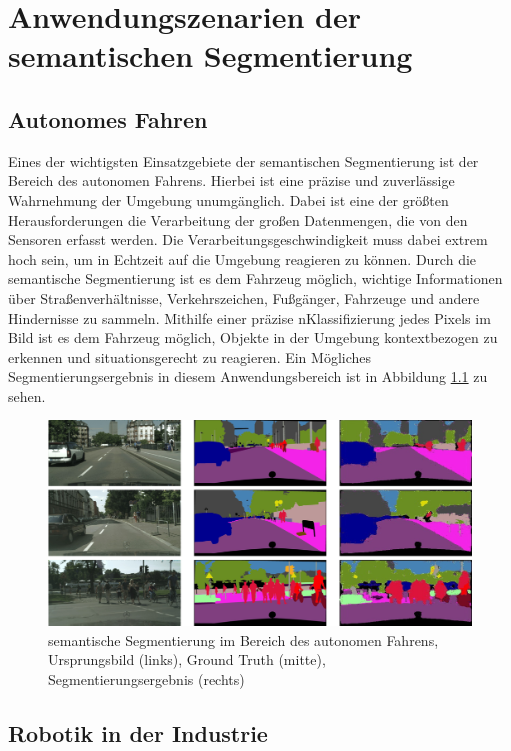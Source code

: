 \chapter{Anwendungszenarien der semantischen Segmentierung}
\section{Autonomes Fahren}
Eines der wichtigsten Einsatzgebiete der semantischen Segmentierung ist der
Bereich des autonomen Fahrens. Hierbei ist eine präzise und zuverlässige
Wahrnehmung der Umgebung unumgänglich. Dabei ist eine der größten
Herausforderungen die Verarbeitung der großen Datenmengen, die von den Sensoren
erfasst werden. Die Verarbeitungsgeschwindigkeit muss dabei extrem hoch sein,
um in Echtzeit auf die Umgebung reagieren zu können. Durch die semantische
Segmentierung ist es dem Fahrzeug möglich, wichtige Informationen über
Straßenverhältnisse, Verkehrszeichen, Fußgänger, Fahrzeuge und andere
Hindernisse zu sammeln. Mithilfe einer präzise nKlassifizierung jedes Pixels im
Bild ist es dem Fahrzeug möglich, Objekte in der Umgebung kontextbezogen zu
erkennen und situationsgerecht zu reagieren. Ein Mögliches
Segmentierungsergebnis in diesem Anwendungsbereich ist in Abbildung
\ref{fig:SS_auto} zu sehen. \cite{9000872}

\begin{figure}[H]
    \centering
    \includegraphics[width=1\textwidth]{bilder/autonomous_driving2.jpg}
    \captionsetup{font=small} %
    \caption[semantische Segmentierung im Bereich des autonomen Fahrens]{semantische Segmentierung im Bereich des autonomen Fahrens, Ursprungsbild (links), Ground Truth (mitte), Segmentierungsergebnis (rechts) \cite{madokoro2022semantic}}
    \label{fig:SS_auto}
\end{figure}

\section{Robotik in der Industrie}

